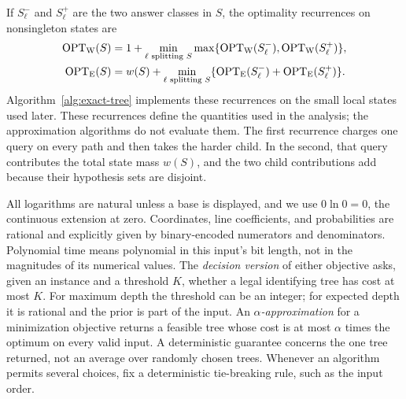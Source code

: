 If $S_\ell^-$ and $S_\ell^+$ are the two answer classes in $S$,
the optimality recurrences on nonsingleton states are
\[
 \begin{split}
 \operatorname{OPT}_{\mathrm W}(S)&=1+\min_{\ell\text{ splitting }S}
                    \max\{\operatorname{OPT}_{\mathrm W}(S_\ell^-),
                         \operatorname{OPT}_{\mathrm W}(S_\ell^+)\},\\
 \operatorname{OPT}_{\mathrm E}(S)&=w(S)+\min_{\ell\text{ splitting }S}
                    \{\operatorname{OPT}_{\mathrm E}(S_\ell^-)
                      +\operatorname{OPT}_{\mathrm E}(S_\ell^+)\}.
 \end{split}
\]
Algorithm~\ref{alg:exact-tree} implements these recurrences on the
small local states used later. These recurrences define the quantities used in the analysis; the
approximation algorithms do not evaluate them. The first recurrence
charges one query on every path and then takes the harder child. In
the second, that query contributes the total state mass $w(S)$, and
the two child contributions add because their hypothesis sets are
disjoint.



All logarithms are natural unless a base is displayed, and
we use $0\ln0=0$, the continuous extension at zero.
Coordinates, line coefficients, and probabilities are rational
and explicitly given by binary-encoded numerators and denominators.
Polynomial time means polynomial in this input's bit length,
not in the magnitudes of its numerical values.
The \emph{decision version} of either objective asks, given an
instance and a threshold $K$, whether a legal identifying tree
has cost at most $K$. For maximum depth the threshold can be
an integer; for expected depth it is rational and the prior is
part of the input.
An \emph{$\alpha$-approximation} for a minimization objective returns
a feasible tree whose cost is at most $\alpha$ times the optimum
on every valid input. A deterministic guarantee concerns the one
tree returned, not an average over randomly chosen trees.
Whenever an algorithm permits several choices, fix a deterministic
tie-breaking rule, such as the input order.

